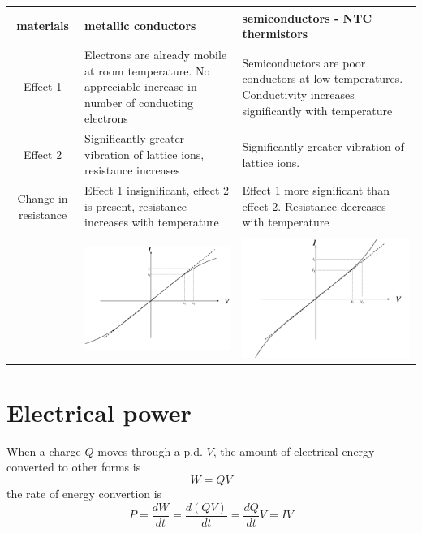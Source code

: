 \documentclass[a4paper, 10pt]{article}
\begin{document}
\begin{center}
   \begin{tabular}{c | T | T}
      materials & metallic conductors & semiconductors - NTC thermistors \\
      \hline
      Effect 1 & Electrons are already mobile at room temperature. No appreciable increase in number of conducting electrons & Semiconductors are poor conductors at low temperatures. Conductivity increases significantly with temperature \\
      \hline
      Effect 2 & Significantly greater vibration of lattice ions, resistance increases & Significantly greater vibration of lattice ions.\\
      \hline
      Change in resistance & Effect 1 insignificant, effect 2 is present, resistance increases with temperature & Effect 1 more significant than effect 2. Resistance decreases with temperature \\ & &  \\
                           &\includegraphics[trim = 50 50 50 50, width=6cm]{figures/2.pdf} & \includegraphics[trim = 50 50 50 50, width=6cm]{figures/3.pdf}   \\
   \end{tabular}
\end{center}

\section{Electrical power}
When a charge $Q$ moves through a p.d. $V$, the amount of electrical energy converted to other forms is
\[
W = QV
\]
the rate of energy convertion is
\[
   P = \frac{dW}{dt} = \frac{d(QV)}{dt} = \frac{dQ}{dt}V = IV
\]
\end{document}
